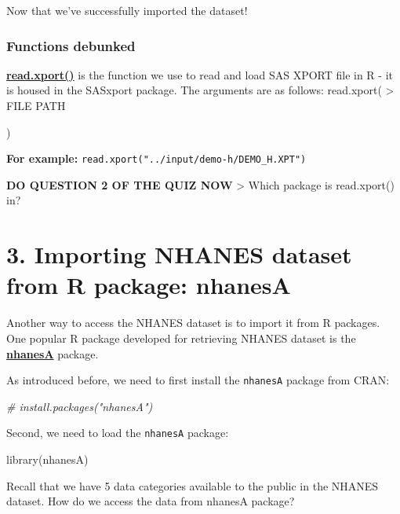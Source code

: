 \documentclass[
]{book}
\newenvironment{Shaded}{\begin{snugshade}}{\end{snugshade}}
\newcommand{\CommentTok}[1]{\textcolor[rgb]{0.56,0.35,0.01}{\textit{#1}}}
\newcommand{\FunctionTok}[1]{\textcolor[rgb]{0.00,0.00,0.00}{#1}}
\newcommand{\NormalTok}[1]{#1}
\begin{document}
Now that we've successfully imported the dataset!

\hypertarget{functions-debunked-6}{%
\subsubsection{Functions debunked}\label{functions-debunked-6}}

\href{https://www.rdocumentation.org/packages/SASxport/versions/1.7.0/topics/read.xport}{\textbf{read.xport()}} is the function we use to read and load SAS XPORT file in R - it is housed in the SASxport package. The arguments are as follows:
read.xport(
\textgreater{} FILE PATH

)

\textbf{For example:} \texttt{read.xport("../input/demo-h/DEMO\_H.XPT")}

\textbf{DO QUESTION 2 OF THE QUIZ NOW}
\textgreater{} Which package is read.xport() in?

\hypertarget{importing-nhanes-dataset-from-r-package-nhanesa}{%
\section{3. Importing NHANES dataset from R package: nhanesA}\label{importing-nhanes-dataset-from-r-package-nhanesa}}

Another way to access the NHANES dataset is to import it from R packages. One popular R package developed for retrieving NHANES dataset is the \href{https://www.rdocumentation.org/packages/nhanesA/versions/0.6.5.3}{\textbf{nhanesA}} package.

As introduced before, we need to first install the \texttt{nhanesA} package from CRAN:

\begin{Shaded}
\begin{Highlighting}[]
\CommentTok{\# install.packages("nhanesA")}
\end{Highlighting}
\end{Shaded}

Second, we need to load the \texttt{nhanesA} package:

\begin{Shaded}
\begin{Highlighting}[]
\FunctionTok{library}\NormalTok{(nhanesA)}
\end{Highlighting}
\end{Shaded}

Recall that we have 5 data categories available to the public in the NHANES dataset. How do we access the data from nhanesA package?
\end{document}
